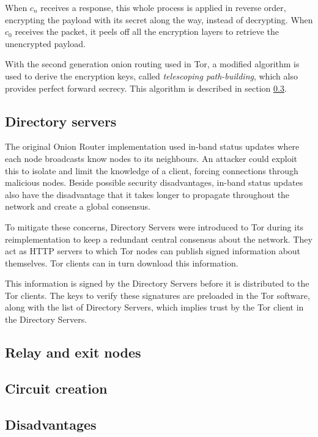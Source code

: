 \documentclass[journal]{IEEEtran}
\begin{document}
			When $c_n$ receives a response, this whole process is applied in reverse order, encrypting the payload with its secret along the way, instead of decrypting. When $c_0$ receives the packet, it peels off all the encryption layers to retrieve the unencrypted payload. 
			
			With the second generation onion routing used in Tor, a modified algorithm is used to derive the encryption keys, called \emph{telescoping path-building}, which also provides perfect forward secrecy. This algorithm is described in section \ref{ss:tor_circuit}.
			
			
		\subsection{Directory servers}
			The original Onion Router implementation used in-band status updates where each node broadcasts know nodes to its neighbours. An attacker could exploit this to isolate and limit the knowledge of a client, forcing connections through malicious nodes. Beside possible security disadvantages, in-band status updates also have the disadvantage that it takes longer to propagate throughout the network and create a global consensus.
			
			To mitigate these concerns, Directory Servers were introduced to Tor during its reimplementation to keep a redundant central consensus about the network. They act as HTTP servers to which Tor nodes can publish signed information about themselves. Tor clients can in turn download this information.
			
			This information is signed by the Directory Servers before it is distributed to the Tor clients. The keys to verify these signatures are preloaded in the Tor software, along with the list of Directory Servers, which implies trust by the Tor client in the Directory Servers.
			
			
		\subsection{Relay and exit nodes}
		
		\subsection{Circuit creation}
			\label{ss:tor_circuit}
		
		\subsection{Disadvantages}
		
\end{document}
